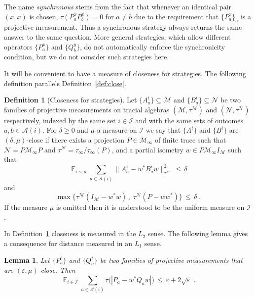 \documentclass[11pt]{article}
\newtheorem{lemma}[theorem]{Lemma}
\theoremstyle{definition}
\newtheorem{definition}[theorem]{Definition}
\newcommand{\Id}{\ensuremath{I}}
\DeclareMathOperator*{\Expectation}{\mathbb{E}}
\newcommand{\Es}[1]{\Expectation_{#1}}
\newcommand{\mA}{\ensuremath{\mathcal{A}}}
\newcommand{\mM}{\ensuremath{\mathcal{M}}}
\newcommand{\mI}{\ensuremath{\mathcal{I}}}
\newcommand{\cM}{\ensuremath{\mathcal{M}}}
\newcommand{\eps}{\varepsilon}
\newcommand{\mN}{\mathcal{N}}
\begin{document}
The name \emph{synchronous} stems from the fact that whenever an identical pair $(x,x)$ is chosen, $\tau(P^x_a P^x_b)=0$ for $a\neq b$ due to the requirement that $\{P^x_a\}_a$ is a projective measurement. Thus a synchronous strategy always returns the same answer to the same question. More general strategies, which allow different operators $\{P^x_a\}$ and $\{Q^y_b\}$, do not automatically enforce the synchronicity condition, but we do not consider such strategies here. 

It will be convenient to have a measure of closeness for strategies. The following definition parallels Definition~\ref{def:close}. 

	\begin{definition}[Closeness for strategies]\label{def:close-meas}
Let $\{A^i_a\}\subseteq \mM$ and $\{B^i_a\}\subseteq \mN$ be two families of projective measurements on  tracial algebras $(\mM,\tau^\mM)$ and $(\mN,\tau^\mN)$ respectively, indexed by the same set $i\in \mI$ and with the same sets of outcomes $a,b\in\mA(i)$. For $\delta\geq0$ and $\mu$ a measure on $\mI$ we say that $\{A^i\}$ and $\{B^i\}$ are $(\delta,\mu)$-close if there exists a projection $P\in\mM_\infty$ of finite trace such that $\mN=P\mM_\infty P$ and $\tau^\mN=\tau_\infty/\tau_\infty(P)$, and a partial isometry $w\in P \mM_\infty \Id_\mM$ such that 
\[ \Es{i\sim\mu} \sum_{a\in\mA(i)} \big\| A^i_a - w^* B^i_a w \big\|_{\tau^\cM}^2 \,\leq\,\delta\]
and 
\[\max\big\{ \tau^\mM(\Id_\mM-w^*w)\,,\; \tau^\mN(P-ww^*)\big\} \,\leq\, \delta\;.\]
If the measure $\mu$ is omitted then it is understood to be the uniform measure on $\mI$.
\end{definition}

In Definition~\ref{def:close-meas} closeness is measured in the $L_2$ sense. The following lemma gives a consequence for distance measured in an $L_1$ sense. 


\begin{lemma}\label{lem:l1-l2}
Let $\{P_a^i\}$ and $\{Q_a^i\}$ be two families of projective measurements that are $(\eps,\mu)$-close. Then 
\begin{equation}\label{eq:l1-l2}
\Es{i\in\mI} \sum_{a\in \mA(i)} \tau\big(|P_a-w^*Q_aw|\big) \,\leq\, \eps+ 2 \sqrt{\eps}\;.
\end{equation}
\end{lemma}
\end{document}
